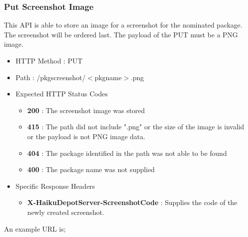 \subsubsection{Put Screenshot Image}

This API is able to store an image for a screenshot for the nominated package.  The screenshot will be ordered last.  The payload of the PUT must be a PNG image.

\begin{itemize}
\item HTTP Method : PUT
\item Path : /pkgscreenshot/$<$pkgname$>$.png
\item Expected HTTP Status Codes
  \begin{itemize}
  \item {\bf 200} : The screenshot image was stored
  \item {\bf 415} : The path did not include ".png" or the size of the image is invalid or the payload is not PNG image data.
  \item {\bf 404} : The package identified in the path was not able to be found
  \item {\bf 400} : The package name was not supplied
  \end{itemize}
\item Specific Response Headers
  \begin{itemize}
  \item {\bf X-HaikuDepotServer-ScreenshotCode} : Supplies the code of the newly created screenshot.
  \end{itemize}
\end{itemize}

An example URL is;






